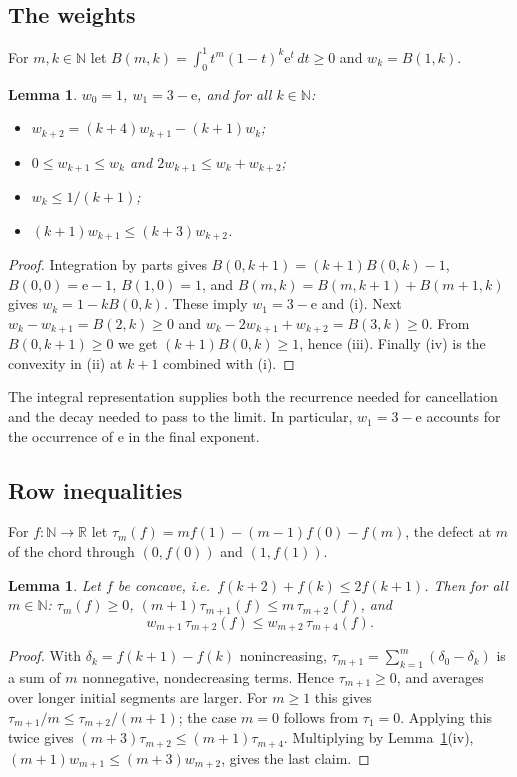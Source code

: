 \documentclass[11pt]{amsart}
\newtheorem{lemma}[theorem]{Lemma}
\theoremstyle{definition}
\theoremstyle{remark}
\numberwithin{equation}{section}
\newcommand{\N}{\mathbb{N}}
\newcommand{\R}{\mathbb{R}}
\newcommand{\e}{\mathrm{e}}
\begin{document}
\subsection{The weights}
For $m,k\in\N$ let $B(m,k)=\int_0^1t^m(1-t)^k\e^t\,dt\ge0$ and $w_k=B(1,k)$.

\begin{lemma}\label{lem:weights}
$w_0=1$, $w_1=3-\e$, and for all $k\in\N$:
\begin{itemize}
\item[(i)] $w_{k+2}=(k+4)w_{k+1}-(k+1)w_k$;
\item[(ii)] $0\le w_{k+1}\le w_k$ and $2w_{k+1}\le w_k+w_{k+2}$;
\item[(iii)] $w_k\le1/(k+1)$;
\item[(iv)] $(k+1)w_{k+1}\le(k+3)w_{k+2}$.
\end{itemize}
\end{lemma}

\begin{proof}
Integration by parts gives $B(0,k+1)=(k+1)B(0,k)-1$, $B(0,0)=\e-1$, $B(1,0)=1$, and
$B(m,k)=B(m,k+1)+B(m+1,k)$ gives $w_k=1-kB(0,k)$. These imply $w_1=3-\e$ and (i). Next
$w_k-w_{k+1}=B(2,k)\ge0$ and $w_k-2w_{k+1}+w_{k+2}=B(3,k)\ge0$. From $B(0,k+1)\ge0$ we get
$(k+1)B(0,k)\ge1$, hence (iii). Finally (iv) is the convexity in (ii) at $k+1$ combined with (i).
\end{proof}

The integral representation supplies both the recurrence needed for
cancellation and the decay needed to pass to the limit. In particular,
$w_1=3-\e$ accounts for the occurrence of $\e$ in the final exponent.

\subsection{Row inequalities}
For $f:\N\to\R$ let $\tau_m(f)=mf(1)-(m-1)f(0)-f(m)$, the defect at $m$ of the chord through
$(0,f(0))$ and $(1,f(1))$.

\begin{lemma}\label{lem:rows}
Let $f$ be concave, i.e.\ $f(k+2)+f(k)\le2f(k+1)$. Then for all $m\in\N$: $\tau_m(f)\ge0$,
$(m+1)\tau_{m+1}(f)\le m\,\tau_{m+2}(f)$, and
\[
  w_{m+1}\,\tau_{m+2}(f)\le w_{m+2}\,\tau_{m+4}(f).
\]
\end{lemma}

\begin{proof}
With $\delta_k=f(k+1)-f(k)$ nonincreasing, $\tau_{m+1}=\sum_{k=1}^{m}(\delta_0-\delta_k)$ is a sum of
$m$ nonnegative, nondecreasing terms. Hence $\tau_{m+1}\ge0$, and averages over longer initial segments are larger. For $m\ge1$ this gives
$\tau_{m+1}/m\le\tau_{m+2}/(m+1)$; the case $m=0$ follows from $\tau_1=0$. Applying this twice gives
$(m+3)\tau_{m+2}\le(m+1)\tau_{m+4}$. Multiplying by Lemma~\ref{lem:weights}(iv),
$(m+1)w_{m+1}\le(m+3)w_{m+2}$, gives the last claim.
\end{proof}
\end{document}
